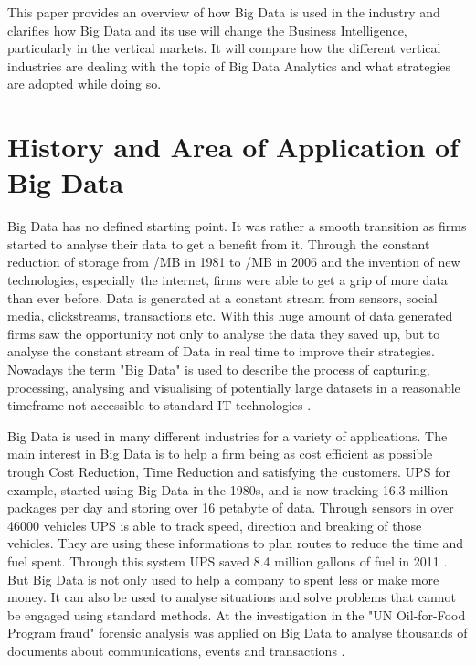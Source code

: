 \documentclass[runningheads]{llncs}
\begin{document}
This paper provides an overview of how Big Data is used in the industry and clarifies how Big Data and its use will change the Business Intelligence, particularly in the vertical markets. It will compare how the different vertical industries are dealing with the topic of Big Data Analytics and what strategies are adopted while doing so.

\section{History and Area of Application of Big Data}
Big Data has no defined starting point. It was rather a smooth transition as firms started to analyse their data to get a benefit from it. Through the constant reduction of storage from /MB in 1981 to /MB in 2006 \cite{PCMAGAZINE} and the invention of new technologies, especially the internet, firms were able to get a grip of more data than ever before. 
Data is generated at a constant stream from sensors, social media, clickstreams, transactions etc. With this huge amount of data generated firms saw the opportunity not only to analyse the data they saved up, but to analyse the constant stream of Data in real time to improve their strategies. Nowadays the term "Big Data" is used to describe the process of capturing, processing, analysing and visualising of potentially large datasets in a reasonable timeframe not accessible to standard IT technologies \cite{NESSI}. 

Big Data is used in many different industries for a variety of applications. The main interest in Big Data is to help a firm being as cost efficient as possible trough Cost Reduction, Time Reduction and satisfying the customers. UPS for example, started using Big Data in the 1980s, and is now tracking 16.3 million packages per day and storing over 16 petabyte of data. Through sensors in over 46000 vehicles UPS is able to track speed, direction and breaking of those vehicles. They are using these informations to plan routes to reduce the time and fuel spent. Through this system UPS saved 8.4 million gallons of fuel in 2011 \cite{DAVENPORT}. But Big Data is not only used to help a company to spent less or make more money. It can also be used to analyse situations and solve problems that cannot be engaged using standard methods. At the investigation in the "UN Oil-for-Food Program fraud" forensic analysis was applied on Big Data to analyse thousands of documents about communications, events and transactions \cite{Hans}.
\end{document}
